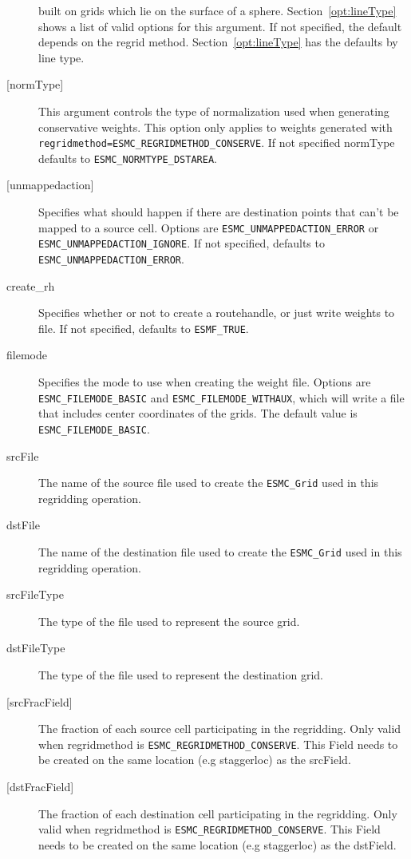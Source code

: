 \begin{description}
      built on grids which lie on the surface of a sphere. Section~\ref{opt:lineType} shows a
      list of valid options for this argument. If not specified, the default depends on the
      regrid method. Section~\ref{opt:lineType} has the defaults by line type.
    \item[{[normType]}]
      This argument controls the type of normalization used when generating conservative weights.
      This option only applies to weights generated with {\tt regridmethod=ESMC\_REGRIDMETHOD\_CONSERVE}.
      If not specified normType defaults to {\tt ESMC\_NORMTYPE\_DSTAREA}.
    \item[{[unmappedaction]}]
      Specifies what should happen if there are destination points that can't
      be mapped to a source cell. Options are {\tt ESMC\_UNMAPPEDACTION\_ERROR} or
      {\tt ESMC\_UNMAPPEDACTION\_IGNORE}. If not specified, defaults to {\tt ESMC\_UNMAPPEDACTION\_ERROR}.
    \item[{create\_rh}]
      Specifies whether or not to create a routehandle, or just write weights to file.
      If not specified, defaults to {\tt ESMF\_TRUE}.
    \item[{filemode}]
      Specifies the mode to use when creating the weight file. Options are
      {\tt ESMC\_FILEMODE\_BASIC} and {\tt ESMC\_FILEMODE\_WITHAUX}, which will
      write a file that includes center coordinates of the grids. The default 
      value is {\tt ESMC\_FILEMODE\_BASIC}.
    \item[{srcFile}]
      The name of the source file used to create the {\tt ESMC\_Grid} used
      in this regridding operation.
    \item[{dstFile}]
      The name of the destination file used to create the {\tt ESMC\_Grid} used
      in this regridding operation.
    \item[{srcFileType}]
      The type of the file used to represent the source grid.
    \item[{dstFileType}]
      The type of the file used to represent the destination grid.
    \item [{[srcFracField]}]
      The fraction of each source cell participating in the regridding. Only
      valid when regridmethod is {\tt ESMC\_REGRIDMETHOD\_CONSERVE}.
      This Field needs to be created on the same location (e.g staggerloc)
      as the srcField.
    \item [{[dstFracField]}]
      The fraction of each destination cell participating in the regridding. Only
      valid when regridmethod is {\tt ESMC\_REGRIDMETHOD\_CONSERVE}.
      This Field needs to be created on the same location (e.g staggerloc)
      as the dstField.
    \end{description}
   
